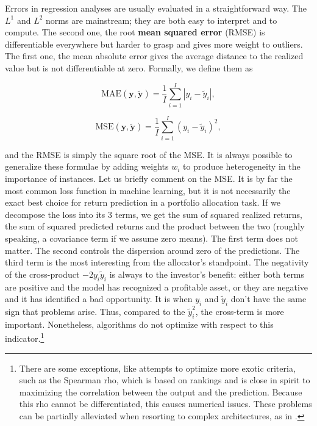 Errors in regression analyses are usually evaluated in a straightforward way. The $L^1$ and $L^2$ norms are mainstream; they are both easy to interpret and to compute. The second one, the root \textbf{mean squared error} (RMSE) is differentiable everywhere but harder to grasp and gives more weight to outliers. The first one, the mean absolute error gives the average distance to the realized value but is not differentiable at zero. Formally, we define them as

\begin{equation}
\label{eq-MAE}
\text{MAE}(\textbf{y},\tilde{\textbf{y}})=\frac{1}{I}\sum_{i=1}^I|y_i-\tilde{y}_i|,
\end{equation}

\begin{equation}
\label{eq-MSE}
\text{MSE}(\textbf{y},\tilde{\textbf{y}})=\frac{1}{I}\sum_{i=1}^I(y_i-\tilde{y}_i)^2,
\end{equation}

and the RMSE is simply the square root of the MSE. It is always possible to generalize these formulae by adding weights $w_i$ to produce heterogeneity in the importance of instances. Let us briefly comment on the MSE. It is by far the most common loss function in machine learning, but it is not necessarily the exact best choice for return prediction in a portfolio allocation task. If we decompose the loss into its 3 terms, we get the sum of squared realized returns, the sum of squared predicted returns and the product between the two (roughly speaking, a covariance term if we assume zero means). The first term does not matter. The second controls the dispersion around zero of the predictions. The third term is the most interesting from the allocator's standpoint. The negativity of the cross-product $-2y_i\tilde{y}_i$ is always to the investor's benefit: either both terms are positive and the model has recognized a profitable asset, or they are negative and it has identified a bad opportunity. It is when $y_i$ and $\tilde{y}_i$ don't have the same sign that problems arise. Thus, compared to the $\tilde{y}_i^2$, the cross-term is more important. Nonetheless, algorithms do not optimize with respect to this indicator.\footnote{There are some exceptions, like attempts to optimize more exotic criteria, such as the Spearman rho, which is based on rankings and is close in spirit to maximizing the correlation between the output and the prediction. Because this rho cannot be differentiated, this causes numerical issues. These problems can be partially alleviated when resorting to complex architectures, as in \cite{engilberge2019sodeep}.}

